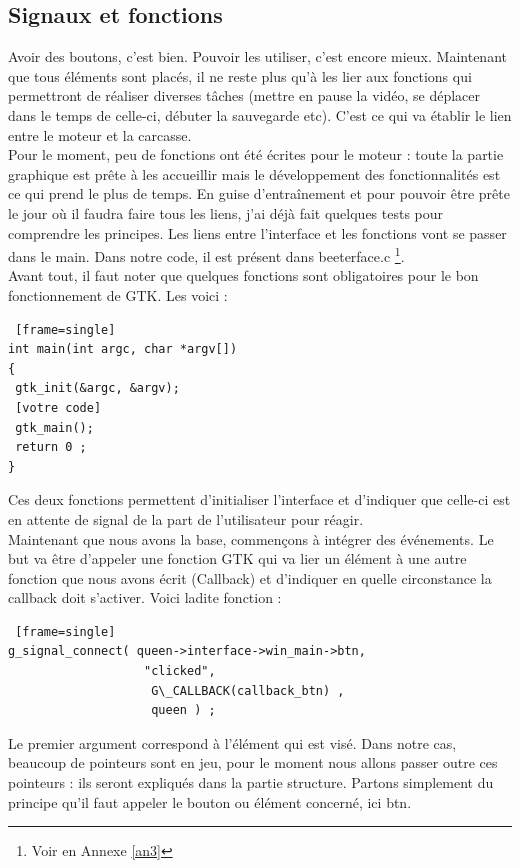 \documentclass[11pt,french,a4paper]{report}
\begin{document}
        \subsection{Signaux et fonctions} 
Avoir des boutons, c'est bien. Pouvoir les utiliser, c'est encore mieux. Maintenant que tous éléments sont placés, 
il ne reste plus qu'à les lier aux fonctions qui permettront de réaliser diverses tâches (mettre en pause la vidéo,
se déplacer dans le temps de celle-ci, débuter la sauvegarde etc).    
C'est ce qui va établir le lien entre le moteur et la carcasse. \\
Pour le moment, peu de fonctions ont été écrites pour le moteur : toute la partie graphique est prête à les accueillir 
mais le développement des fonctionnalités est ce qui prend le plus de temps. En guise d'entraînement et pour 
pouvoir être prête le jour où il faudra faire tous les liens, j'ai déjà fait quelques tests pour comprendre les principes.
Les liens entre l'interface et les fonctions vont se passer dans le main. Dans notre code, il est présent dans beeterface.c 
\footnote{Voir en Annexe \ref{an3}}.\\
Avant tout, il faut noter que quelques fonctions sont obligatoires pour le bon fonctionnement de GTK. Les voici : \\
\begin{lstlisting} [frame=single]
int main(int argc, char *argv[])     
{ 
 gtk_init(&argc, &argv); 
 [votre code] 
 gtk_main();
 return 0 ;
} 
\end{lstlisting}
Ces deux fonctions permettent d'initialiser l'interface et d'indiquer que celle-ci est en attente de signal
de la part de l'utilisateur pour réagir. \\
Maintenant que nous avons la base, commençons à intégrer des événements.
Le but va être d'appeler une fonction GTK qui va lier un élément à une autre fonction que nous avons écrit  (Callback) 
et d'indiquer en quelle circonstance la callback doit s'activer. Voici ladite fonction : 
\begin{lstlisting} [frame=single]
g_signal_connect( queen->interface->win_main->btn,
                   "clicked", 
                    G\_CALLBACK(callback_btn) ,
                    queen ) ; 
\end{lstlisting}
Le premier argument correspond à l'élément qui est visé. Dans notre cas, beaucoup de pointeurs sont en jeu,
pour le moment nous allons passer outre ces pointeurs : ils seront expliqués dans la partie structure. 
Partons simplement du principe qu'il faut appeler le bouton ou élément concerné, ici btn.  
\end{document}
